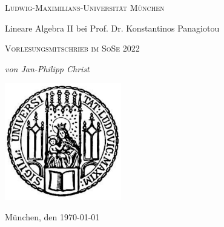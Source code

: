 \documentclass[11pt]{book}
\begin{document}
  \frontmatter
  \begin{titlepage}
\centering
	{\scshape\LARGE Ludwig-Maximilians-Universität \linebreak München \par}
	\vspace{1cm}
	
	{\huge\bfseries \par Lineare Algebra II \linebreak bei Prof. Dr. Konstantinos Panagiotou \par}
	\vspace{2cm}
	{\scshape\Large Vorlesungsmitschrieb im SoSe 2022\par}
	\vspace{1.5cm}
	{\Large\itshape von Jan-Philipp Christ \par}
	\vspace{4cm}
	\begin{center}
    \includegraphics[width=2in]{siegel}
  \end{center}
	{\large München, den \today \par}
\end{titlepage}
{\let\cleardoublepage\relax \frontmatter}

  \tableofcontents

  \mainmatter\setcounter{page}{1}


  \backmatter
\renewcommand{\indexname}{Stichwortverzeichnis}
\printindex
\end{document}
